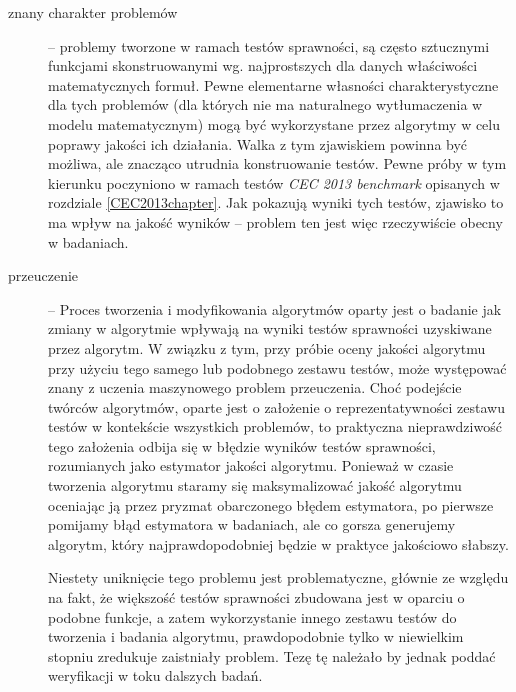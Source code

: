 \documentclass[12pt,a4paper]{report}
\begin{document}
{{{{{{{\begin{description}
\item[znany charakter problemów] -- problemy tworzone w ramach testów sprawności, są często sztucznymi funkcjami skonstruowanymi wg. najprostszych dla danych właściwości matematycznych formuł. Pewne elementarne własności charakterystyczne dla tych problemów (dla których nie ma naturalnego wytłumaczenia w modelu matematycznym) mogą być wykorzystane przez algorytmy w celu poprawy jakości ich działania. Walka z tym zjawiskiem powinna być możliwa, ale znacząco utrudnia konstruowanie testów. Pewne próby w tym kierunku poczyniono w ramach testów \emph{CEC 2013 benchmark} opisanych w rozdziale \ref{CEC2013chapter}. Jak pokazują wyniki tych testów, zjawisko to ma wpływ na jakość wyników -- problem ten jest więc rzeczywiście obecny w badaniach.
\item[przeuczenie] -- Proces tworzenia i modyfikowania algorytmów oparty jest o badanie jak zmiany w algorytmie wpływają na wyniki testów sprawności uzyskiwane przez algorytm. W związku z tym, przy próbie oceny jakości algorytmu przy użyciu tego samego lub podobnego zestawu testów, może występować znany z uczenia maszynowego problem przeuczenia. Choć podejście twórców algorytmów, oparte jest o założenie o reprezentatywności zestawu testów w kontekście wszystkich problemów, to praktyczna nieprawdziwość tego założenia odbija się w błędzie wyników testów sprawności, rozumianych jako estymator jakości algorytmu. Ponieważ w czasie tworzenia algorytmu staramy się maksymalizować jakość algorytmu oceniając ją przez pryzmat obarczonego błędem estymatora, po pierwsze pomijamy błąd estymatora w badaniach, ale co gorsza generujemy algorytm, który najprawdopodobniej będzie w praktyce jakościowo słabszy.

\par{
Niestety uniknięcie tego problemu jest problematyczne, głównie ze względu na fakt, że większość testów sprawności zbudowana jest w oparciu o podobne funkcje, a zatem wykorzystanie innego zestawu testów do tworzenia i badania algorytmu, prawdopodobnie tylko w niewielkim stopniu zredukuje zaistniały problem. Tezę tę należało by jednak poddać weryfikacji w toku dalszych badań.
} 
\end{description}
}
}}}}}}
\end{document}
